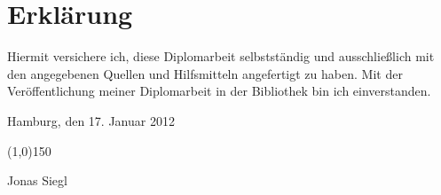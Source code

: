 \chapter*{Erkl\"arung}
Hiermit versichere ich, diese Diplomarbeit selbstst\"andig und ausschlie\ss lich mit den angegebenen Quellen und Hilfsmitteln angefertigt zu haben. Mit der Ver\"offentlichung meiner Diplomarbeit in der Bibliothek bin ich einverstanden.\par
\vspace{3em}
\noindent Hamburg, den 17. Januar 2012\par
\vspace{6em}
\noindent \line(1,0){150}\par
\noindent Jonas Siegl
